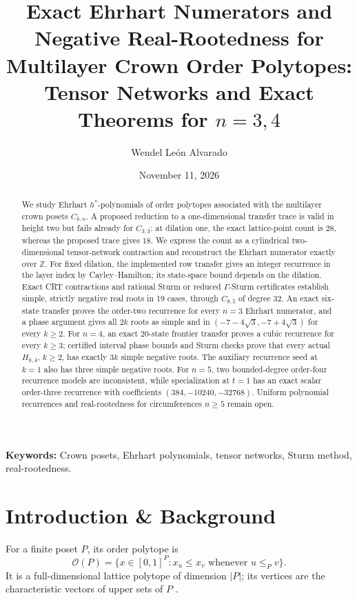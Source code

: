 \documentclass[11pt,a4paper]{article}
\title{Exact Ehrhart Numerators and Negative Real-Rootedness for Multilayer Crown Order Polytopes: Tensor Networks and Exact Theorems for $n=3,4$}
\author{Wendel León Alvarado}
\date{November 11, 2026}
\theoremstyle{definition}
\begin{document}
\maketitle

\begin{abstract}
We study Ehrhart $h^*$-polynomials of order polytopes associated with the multilayer crown posets $C_{k,n}$. A proposed reduction to a one-dimensional transfer trace is valid in height two but fails already for $C_{3,3}$: at dilation one, the exact lattice-point count is $28$, whereas the proposed trace gives $18$. We express the count as a cylindrical two-dimensional tensor-network contraction and reconstruct the Ehrhart numerator exactly over $\mathbb{Z}$. For fixed dilation, the implemented row transfer gives an integer recurrence in the layer index by Cayley--Hamilton; its state-space bound depends on the dilation. Exact CRT contractions and rational Sturm or reduced $\Gamma$-Sturm certificates establish simple, strictly negative real roots in 19 cases, through $C_{8,5}$ of degree 32. An exact six-state transfer proves the order-two recurrence for every $n=3$ Ehrhart numerator, and a phase argument gives all $2k$ roots as simple and in $(-7-4\sqrt3,-7+4\sqrt3)$ for every $k\ge2$. For $n=4$, an exact 20-state frontier transfer proves a cubic recurrence for every $k\ge3$; certified interval phase bounds and Sturm checks prove that every actual $H_{k,4}$, $k\ge2$, has exactly $3k$ simple negative roots. The auxiliary recurrence seed at $k=1$ also has three simple negative roots. For $n=5$, two bounded-degree order-four recurrence models are inconsistent, while specialization at $t=1$ has an exact scalar order-three recurrence with coefficients $(384,-10240,-32768)$. Uniform polynomial recurrences and real-rootedness for circumferences $n\ge5$ remain open.
\end{abstract}

\small\noindent\textbf{Keywords:} Crown posets, Ehrhart polynomials, tensor networks, Sturm method, real-rootedness.
\normalsize

\section{Introduction \& Background}

For a finite poset $P$, its order polytope is
\begin{equation}
\mathcal{O}(P)=\{x\in[0,1]^P : x_u\le x_v\text{ whenever }u\le_P v\}.
\end{equation}
It is a full-dimensional lattice polytope of dimension $|P|$; its vertices are the characteristic vectors of upper sets of $P$ \cite{Stanley1986}.
\end{document}
